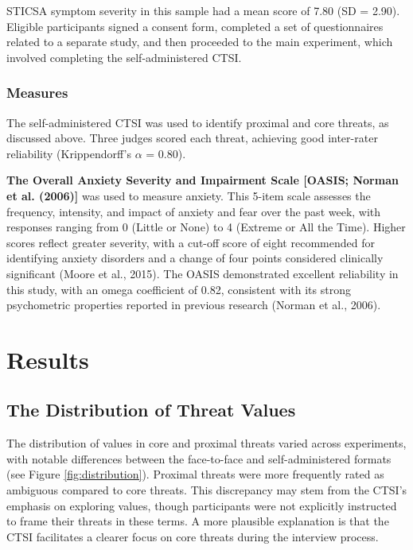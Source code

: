 \documentclass[
  man,floatsintext]{apa7}
\begin{document}
STICSA symptom severity in this sample had a mean score of 7.80 (SD = 2.90).
Eligible participants signed a consent form, completed a set of questionnaires related to a separate study, and then proceeded to the main experiment, which involved completing the self-administered CTSI.

\subsubsection{Measures}\label{measures-4}

The self-administered CTSI was used to identify proximal and core threats, as discussed above.
Three judges scored each threat, achieving good inter-rater reliability (Krippendorff's \(\alpha\) = 0.80).

\textbf{The Overall Anxiety Severity and Impairment Scale {[}OASIS; Norman et al. (2006){]}} was used to measure anxiety.
This 5-item scale assesses the frequency, intensity, and impact of anxiety and fear over the past week, with responses ranging from 0 (Little or None) to 4 (Extreme or All the Time).
Higher scores reflect greater severity, with a cut-off score of eight recommended for identifying anxiety disorders and a change of four points considered clinically significant (Moore et al., 2015).
The OASIS demonstrated excellent reliability in this study, with an omega coefficient of 0.82, consistent with its strong psychometric properties reported in previous research (Norman et al., 2006).

\section{Results}\label{results}

\subsection{The Distribution of Threat Values}\label{the-distribution-of-threat-values}

The distribution of values in core and proximal threats varied across experiments, with notable differences between the face-to-face and self-administered formats (see Figure \ref{fig:distribution}).
Proximal threats were more frequently rated as ambiguous compared to core threats.
This discrepancy may stem from the CTSI's emphasis on exploring values, though participants were not explicitly instructed to frame their threats in these terms.
A more plausible explanation is that the CTSI facilitates a clearer focus on core threats during the interview process.
\end{document}
